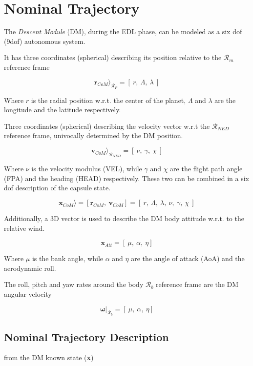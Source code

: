 \chapter{Nominal Trajectory}

The \textit{Descent Module} (DM), during the EDL phase, can be modeled as a
six dof (9dof) autonomous system.

It has three coordinates (spherical) describing its position relative to the
$\mathcal{R}_{m}$ reference frame

        $$
            \textbf{r}_{CoM}\rangle_{\mathcal{R}_{P}} = [\: r,\:\Lambda,\:\lambda \:]
        $$

\noindent Where $r$ is the radial position w.r.t. the center of the planet, $\Lambda$ and $\lambda$ are 
the longitude and the latitude respectively.

Three coordinates (spherical) describing the velocity vector w.r.t the $\mathcal{R}_{NED}$ reference frame, univocally
determined by the DM position.

        $$
            \textbf{v}_{CoM}\rangle_{\mathcal{R}_{NED}} = [\: \nu,\:\gamma,\:\chi \:]
        $$

\noindent Where $\nu$ is the velocity modulus (VEL), while $\gamma$ and $\chi$ are the flight
path angle (FPA) and the heading (HEAD) respectively.
These two can be combined in a six dof description of the capsule state.

        $$
            \textbf{x}_{CoM}\rangle = [\textbf{r}_{CoM},\: \textbf{v}_{CoM}] = [\: r,\:\Lambda,\:\lambda, \: \nu,\:\gamma,\:\chi \:]
        $$

Additionally, a 3D vector is used to describe the DM body attitude w.r.t. to the relative wind.

        $$
            \textbf{x}_{Att} = [\: \mu,\: \alpha,\: \eta]
        $$

\noindent Where $\mu$ is the bank angle, while $\alpha$ and $\eta$ are the 
angle of attack (AoA) and the aerodynamic roll.

The roll, pitch and yaw rates around the body $\mathcal{R}_{b}$ reference frame are the DM angular velocity

        $$
            \boldsymbol{\omega}|_{\mathcal{R}_{b}} = [\: \mu,\: \alpha,\: \eta]
        $$


\newpage

\section{Nominal Trajectory Description}

from the DM known state (\textbf{x})